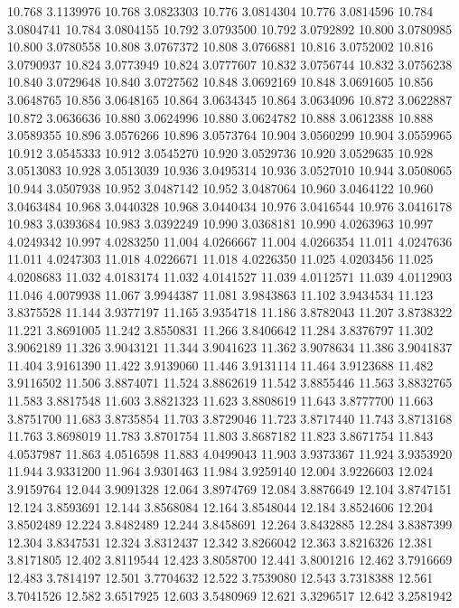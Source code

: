 10.768 3.1139976
10.768 3.0823303
10.776 3.0814304
10.776 3.0814596
10.784 3.0804741
10.784 3.0804155
10.792 3.0793500
10.792 3.0792892
10.800 3.0780985
10.800 3.0780558
10.808 3.0767372
10.808 3.0766881
10.816 3.0752002
10.816 3.0790937
10.824 3.0773949
10.824 3.0777607
10.832 3.0756744
10.832 3.0756238
10.840 3.0729648
10.840 3.0727562
10.848 3.0692169
10.848 3.0691605
10.856 3.0648765
10.856 3.0648165
10.864 3.0634345
10.864 3.0634096
10.872 3.0622887
10.872 3.0636636
10.880 3.0624996
10.880 3.0624782
10.888 3.0612388
10.888 3.0589355
10.896 3.0576266
10.896 3.0573764
10.904 3.0560299
10.904 3.0559965
10.912 3.0545333
10.912 3.0545270
10.920 3.0529736
10.920 3.0529635
10.928 3.0513083
10.928 3.0513039
10.936 3.0495314
10.936 3.0527010
10.944 3.0508065
10.944 3.0507938
10.952 3.0487142
10.952 3.0487064
10.960 3.0464122
10.960 3.0463484
10.968 3.0440328
10.968 3.0440434
10.976 3.0416544
10.976 3.0416178
10.983 3.0393684
10.983 3.0392249
10.990 3.0368181
10.990 4.0263963
10.997 4.0249342
10.997 4.0283250
11.004 4.0266667
11.004 4.0266354
11.011 4.0247636
11.011 4.0247303
11.018 4.0226671
11.018 4.0226350
11.025 4.0203456
11.025 4.0208683
11.032 4.0183174
11.032 4.0141527
11.039 4.0112571
11.039 4.0112903
11.046 4.0079938
11.067 3.9944387
11.081 3.9843863
11.102 3.9434534
11.123 3.8375528
11.144 3.9377197
11.165 3.9354718
11.186 3.8782043
11.207 3.8738322
11.221 3.8691005
11.242 3.8550831
11.266 3.8406642
11.284 3.8376797
11.302 3.9062189
11.326 3.9043121
11.344 3.9041623
11.362 3.9078634
11.386 3.9041837
11.404 3.9161390
11.422 3.9139060
11.446 3.9131114
11.464 3.9123688
11.482 3.9116502
11.506 3.8874071
11.524 3.8862619
11.542 3.8855446
11.563 3.8832765
11.583 3.8817548
11.603 3.8821323
11.623 3.8808619
11.643 3.8777700
11.663 3.8751700
11.683 3.8735854
11.703 3.8729046
11.723 3.8717440
11.743 3.8713168
11.763 3.8698019
11.783 3.8701754
11.803 3.8687182
11.823 3.8671754
11.843 4.0537987
11.863 4.0516598
11.883 4.0499043
11.903 3.9373367
11.924 3.9353920
11.944 3.9331200
11.964 3.9301463
11.984 3.9259140
12.004 3.9226603
12.024 3.9159764
12.044 3.9091328
12.064 3.8974769
12.084 3.8876649
12.104 3.8747151
12.124 3.8593691
12.144 3.8568084
12.164 3.8548044
12.184 3.8524606
12.204 3.8502489
12.224 3.8482489
12.244 3.8458691
12.264 3.8432885
12.284 3.8387399
12.304 3.8347531
12.324 3.8312437
12.342 3.8266042
12.363 3.8216326
12.381 3.8171805
12.402 3.8119544
12.423 3.8058700
12.441 3.8001216
12.462 3.7916669
12.483 3.7814197
12.501 3.7704632
12.522 3.7539080
12.543 3.7318388
12.561 3.7041526
12.582 3.6517925
12.603 3.5480969
12.621 3.3296517
12.642 3.2581942
